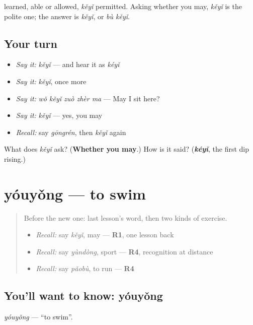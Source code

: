 \begin{grammarlens}[title={What you've built}]
 learned,  able or allowed, \emph{kěyǐ} permitted. Asking whether you may, \emph{kěyǐ} is the polite one; the answer is \emph{kěyǐ}, or \emph{bù kěyǐ}.
\end{grammarlens}

\subsection*{Your turn}
\begin{itemize}
\raggedright
  \item \emph{Say it:} \emph{kěyǐ} — and hear it as \emph{kéyǐ}
  \item \emph{Say it:} \emph{kěyǐ}, once more
  \item \emph{Say it:} \emph{wǒ kěyǐ zuò zhèr ma} — May I sit here?
  \item \emph{Say it:} \emph{kěyǐ} — yes, you may
  \item \emph{Recall:} say \emph{gōngrén}, then \emph{kěyǐ} again
\end{itemize}

\begin{tcolorbox}[breakable,colback=teal!4,colframe=teal!35!black,title={Before you move on}]
What does \emph{kěyǐ} ask? (\textbf{Whether you may}.) How is it said? (\emph{\textbf{kéyǐ}}, the first dip rising.)
\end{tcolorbox}
\section[yóuyǒng]{yóuyǒng — to swim}

\label{lesson:ZH-C90-youyong}



\begin{quote}
Before the new one: last lesson's word, then two kinds of exercise.

\begin{itemize}
\raggedright
  \item \emph{Recall:} say \emph{kěyǐ}, may — \textbf{R1}, one lesson back
  \item \emph{Recall:} say \emph{yùndòng}, sport — \textbf{R4}, recognition at distance
  \item \emph{Recall:} say \emph{pǎobù}, to run — \textbf{R4}
\end{itemize}
\end{quote}

\subsection*{You'll want to know: yóuyǒng}
\emph{yóuyǒng} — \textquotedblleft{}to swim\textquotedblright{}.

